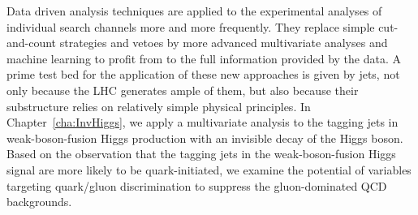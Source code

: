Data driven analysis techniques are applied to the experimental analyses 
of individual search channels more and more frequently. 
They replace simple cut-and-count strategies and vetoes by more advanced multivariate  
analyses and machine learning to profit from to the full
information provided by the data. 
A prime test bed for the application of these new approaches is given by jets,
not only because the LHC generates 
ample of them, but also because their substructure relies on 
relatively simple physical principles.
In Chapter~\ref{cha:InvHiggs}, we apply a multivariate analysis 
to the tagging jets in weak-boson-fusion Higgs production with an invisible 
decay of the Higgs boson. 
%
Based on the observation that the tagging jets in the weak-boson-fusion Higgs signal are more likely
to be quark-initiated, 
we examine the potential of variables targeting quark/gluon discrimination 
to suppress the gluon-dominated QCD backgrounds.
%
%
\\ \medskip \vspace*{-2pt}

%

